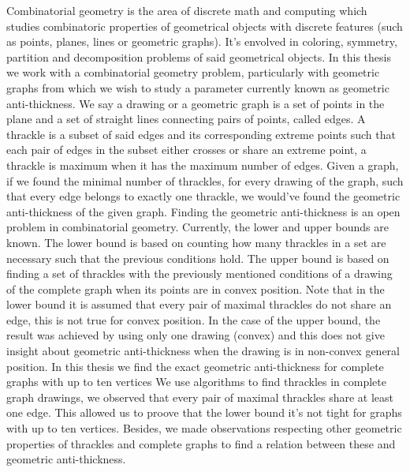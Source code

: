 Combinatorial geometry is the area of discrete math and computing which studies combinatoric properties of geometrical objects with discrete features (such as points, planes, lines or geometric graphs). It's envolved in coloring, symmetry, partition and decomposition problems of said geometrical objects. In this thesis we work with a combinatorial geometry problem, particularly with geometric graphs from which we wish to study a parameter currently known as geometric anti-thickness. We say a drawing or a geometric graph is a set of points in the plane and a set of straight lines connecting pairs of points, called edges. A thrackle is a subset of said edges and its corresponding extreme points such that each pair of edges in the subset either crosses or share an extreme point, a thrackle is maximum when it has the maximum number of edges. Given a graph, if we found the minimal number of thrackles, for every drawing of the graph, such that every edge belongs to exactly one thrackle, we would've found the geometric anti-thickness of the given graph.
Finding the geometric anti-thickness is an open problem in combinatorial geometry. Currently, the lower and upper bounds are known. The lower bound is based on counting how many thrackles in a set are necessary such that the previous conditions hold. The upper bound is based on finding a set of thrackles with the previously mentioned conditions of a drawing of the complete graph when its points are in convex position. Note that in the lower bound it is assumed that every pair of maximal thrackles do not share an edge, this is not true for convex position. In the case of the upper bound, the result was achieved by using only one drawing (convex) and this does not give insight about geometric anti-thickness when the drawing is in non-convex general position. In this thesis we find the exact geometric anti-thickness for complete graphs with up to ten vertices We use algorithms to find thrackles in complete graph drawings, we observed that every pair of maximal thrackles share at least one edge. This allowed us to proove that the lower bound it's not tight for graphs with up to ten vertices. Besides, we made observations respecting other geometric properties of thrackles and complete graphs to find a relation between these and geometric anti-thickness.
